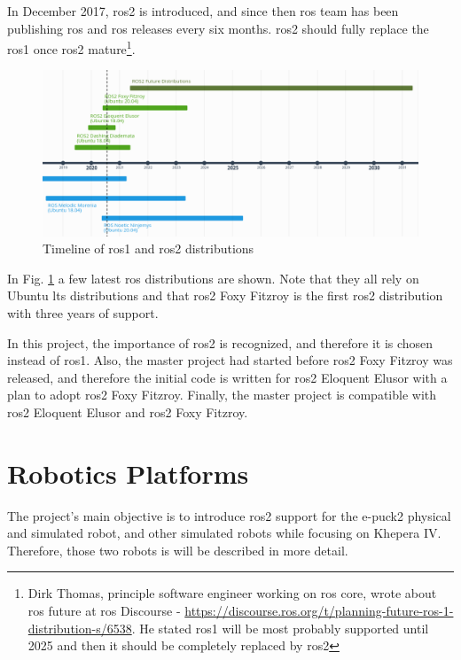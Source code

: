 In December 2017, \ac{ros2} is introduced, and since then \ac{ros} team has been publishing \ac{ros} and \ac{ros} releases every six months.
\ac{ros2} should fully replace the \ac{ros1} once \ac{ros2} mature\footnote{Dirk Thomas, principle software engineer working on \ac{ros} core, wrote about \ac{ros} future at \ac{ros} Discourse -  \url{https://discourse.ros.org/t/planning-future-ros-1-distribution-s/6538}. He stated \ac{ros1} will be most probably supported until 2025 and then it should be completely replaced by \ac{ros2}}.

\begin{figure}[H]
    \centering
    \includegraphics[width=\textwidth]{background/figures/ros_distributions.png}
    \caption{Timeline of \ac{ros1} and \ac{ros2} distributions}
    \label{fig:background:ros_distributions}
\end{figure}

In Fig. \ref{fig:background:ros_distributions} a few latest \ac{ros} distributions are shown.
Note that they all rely on Ubuntu \ac{lts} distributions and that \ac{ros2} Foxy Fitzroy is the first \ac{ros2} distribution with three years of support.

In this project, the importance of \ac{ros2} is recognized, and therefore it is chosen instead of \ac{ros1}.
Also, the master project had started before \ac{ros2} Foxy Fitzroy was released, and therefore the initial code is written for \ac{ros2} Eloquent Elusor with a plan to adopt \ac{ros2} Foxy Fitzroy.
Finally, the master project is compatible with \ac{ros2} Eloquent Elusor and \ac{ros2} Foxy Fitzroy.

\section{Robotics Platforms}
The project's main objective is to introduce \ac{ros2} support for the e-puck2 physical and simulated robot, and other simulated robots while focusing on Khepera IV.
Therefore, those two robots is will be described in more detail.


